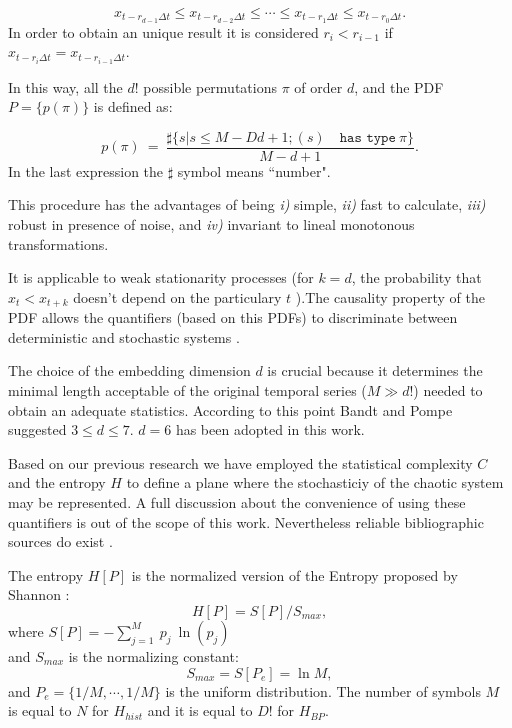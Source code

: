 \begin{equation}
\label{eq:permuta}
x_{t-r_{d-1}\Delta t}\le x_{t-r_{d-2}\Delta t}\le\cdots\le x_{t-r_{1}\Delta t}\le x_{t-r_0\Delta t}.
\end{equation}
%
In order to obtain an unique result it is considered $r_i
<r_{i-1}$ if $x_{t-r_{i}\Delta t}=x_{t-r_{i-1}\Delta t}$.

In this way, all the $d!$ possible permutations $\pi$ of order
$d$, and the PDF $P=\{p(\pi)\}$ is defined as:

\begin{equation}
\label{eq:frequ}
p(\pi)~=~ \frac{\sharp \{s|s\leq M-Dd+1; (s) \quad \texttt{has type}~\pi\}}{M-d+1}.
\end{equation}
In the last expression the $\sharp$ symbol means ``number".

This procedure has the advantages of being {\it i)\/} simple, {\it
ii)\/} fast to calculate, {\it iii)\/} robust in presence of
noise, and {\it iv)\/} invariant to lineal monotonous
transformations.

It is applicable to weak stationarity processes (for
$k=d$, the probability that $x_t < x_{t+k}$ doesn't depend on the
particulary $t$ \cite{Pompe2002}).The causality property of the
PDF allows the quantifiers (based on this PDFs) to discriminate
between deterministic and stochastic systems \cite{Rosso2007B}.

The choice of the embedding dimension $d$ is crucial because it
determines the minimal length acceptable of the original temporal
series ($M \gg d!$) needed to obtain an adequate statistics.
According to this point Bandt and Pompe suggested $3\leq d \leq
7$. $d=6$ has been adopted in this work.

Based on our previous research \cite{DeMicco2009} we have employed
the statistical complexity $C$ and the entropy $H$ to define a plane where the stochasticiy of the chaotic system may be represented. A full discussion about the convenience of using these quantifiers is
out of the scope of this work. Nevertheless reliable bibliographic
sources do exist
\cite{Wackerbauer1994,Lopez1995,Rosso2007A,DeMicco2008,Rosso2009,Martin2006}.

The entropy $H[P]$ is the normalized version of the Entropy proposed by Shannon \cite{Shannon1949a}:
\begin{equation}\label{eq:sha}
H[P] = S[P] /S_{max},
\end{equation}
where $S[P]=-\sum _{j=1}^{M}~p_j~\ln( p_j )$\\ and $S_{max}$ is
the normalizing constant:
\begin{equation}
\label{eq:Smax} S_{max}= S[P_e] = \ln M,
\end{equation}
and $P_e=\{ 1/M, \cdots,1/M\}$ is the uniform distribution. The number of symbols $M$ is equal to $N$ for $H_{hist}$ and it is equal to $D!$ for $H_{BP}$.

